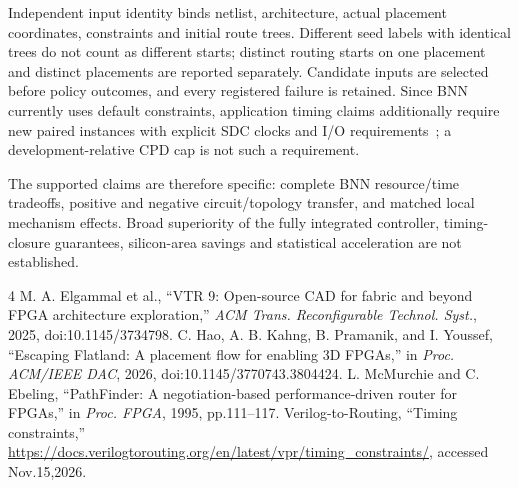 \documentclass[conference,10pt]{IEEEtran}
\begin{document}
Independent input identity binds netlist, architecture, actual placement coordinates, constraints and initial route trees. Different seed labels with identical trees do not count as different starts; distinct routing starts on one placement and distinct placements are reported separately. Candidate inputs are selected before policy outcomes, and every registered failure is retained. Since BNN currently uses default constraints, application timing claims additionally require new paired instances with explicit SDC clocks and I/O requirements~\cite{vprsdc}; a development-relative CPD cap is not such a requirement.

The supported claims are therefore specific: complete BNN resource/time tradeoffs, positive and negative circuit/topology transfer, and matched local mechanism effects. Broad superiority of the fully integrated controller, timing-closure guarantees, silicon-area savings and statistical acceleration are not established.
\begin{thebibliography}{4}
 M. A. Elgammal et al., ``VTR 9: Open-source CAD for fabric and beyond FPGA architecture exploration,'' \emph{ACM Trans. Reconfigurable Technol. Syst.}, 2025, doi:10.1145/3734798.
 C. Hao, A. B. Kahng, B. Pramanik, and I. Youssef, ``Escaping Flatland: A placement flow for enabling 3D FPGAs,'' in \emph{Proc. ACM/IEEE DAC}, 2026, doi:10.1145/3770743.3804424.
 L. McMurchie and C. Ebeling, ``PathFinder: A negotiation-based performance-driven router for FPGAs,'' in \emph{Proc. FPGA}, 1995, pp.111--117.
 Verilog-to-Routing, ``Timing constraints,'' \url{https://docs.verilogtorouting.org/en/latest/vpr/timing_constraints/}, accessed Nov.15,2026.
\end{thebibliography}
\end{document}
